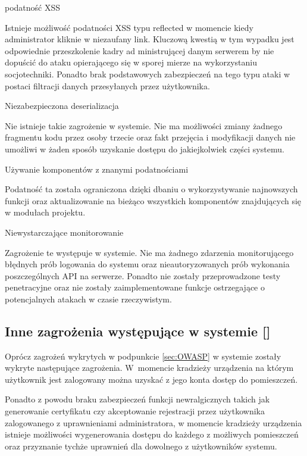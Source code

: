 \begin{enumerate*}
	 \item podatność XSS
	 
	 Istnieje możliwość podatności XSS typu reflected w momencie kiedy administrator kliknie w niezaufany link. Kluczową kwestią w tym wypadku jest odpowiednie przeszkolenie kadry ad ministrującej danym serwerem by nie dopuścić do ataku opierającego się w sporej mierze na wykorzystaniu socjotechniki. Ponadto brak podstawowych zabezpieczeń na tego typu ataki w postaci filtracji danych przesyłanych przez użytkownika. 
	 
	 \item Niezabezpieczona deserializacja
	 
	 Nie istnieje takie zagrożenie w systemie. Nie ma możliwości zmiany żadnego fragmentu kodu przez osoby trzecie oraz fakt przejęcia i modyfikacji danych nie umożliwi w żaden sposób uzyskanie dostępu do jakiejkolwiek części systemu.
	 
	 \item  Używanie komponentów z znanymi podatnościami
	 
	 Podatność ta została ograniczona dzięki dbaniu o wykorzystywanie najnowszych funkcji oraz aktualizowanie na bieżąco wszystkich komponentów znajdujących się w modułach projektu.
	 
	 \item Niewystarczające monitorowanie 
	 
	 Zagrożenie te występuje w systemie. Nie ma żadnego zdarzenia monitorującego błędnych prób logowania do systemu oraz nieautoryzowanych prób wykonania poszczególnych API na serwerze. Ponadto nie zostały przeprowadzone testy penetracyjne oraz nie zostały zaimplementowane funkcje ostrzegające o potencjalnych atakach w czasie rzeczywistym.\cite{OWASP} 
\end{enumerate*}

\newpage
\subsection{Inne zagrożenia występujące w systemie [\StudentB]}

Oprócz zagrożeń wykrytych w podpunkcie \ref{sec:OWASP} w systemie zostały wykryte następujące zagrożenia. W~momencie kradzieży urządzenia na którym użytkownik jest zalogowany można uzyskać z jego konta dostęp do pomieszczeń.
 
 Ponadto z powodu braku zabezpieczeń funkcji newralgicznych takich jak generowanie certyfikatu czy akceptowanie rejestracji przez użytkownika zalogowanego z uprawnieniami administratora, w momencie kradzieży urządzenia istnieje możliwości wygenerowania dostępu do każdego z możliwych pomieszczeń oraz przyznanie tychże uprawnień dla dowolnego z użytkowników systemu. 
 
